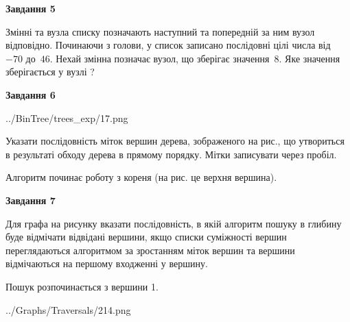 \documentclass[12pt, ukrainian]{article}
\begin{document}
{\begin {large}
{\begin {center}\textbf{Завдання 5}\end {center}}\par
Змінні  та  вузла списку позначають наступний та попередній за ним вузол відповідно. Починаючи з голови, у список записано послідовні цілі числа від~$-70$ до~$46$. Нехай змінна  позначає вузол, що зберігає значення~$8$.
Яке значення зберігається у вузлі  ?\par
\newpage

{\begin {center}\textbf{Завдання 6}\end {center}}\par

\begin{center}
	{../BinTree/trees_exp/17.png}
\end{center}
Указати послідовність міток вершин дерева, зображеного на рис., що утвориться в результаті обходу дерева в прямому порядку. Мітки записувати через пробіл.\par Алгоритм починає роботу з кореня (на рис. це верхня вершина).\par
\newpage

{\begin {center}\textbf{Завдання 7}\end {center}}\par
Для графа на рисунку вказати послідовність, в якій алгоритм пошуку в глибину буде відмічати відвідані вершини, якщо списки суміжності вершин переглядаються алгоритмом за зростанням міток вершин та вершини відмічаються на першому вход\-женні у вершину.\par
Пошук розпочинається з вершини 1.\par

\begin{center}
	{../Graphs/Traversals/214.png}
\end{center}\par
\newpage


\end{large}}
\end{document}
